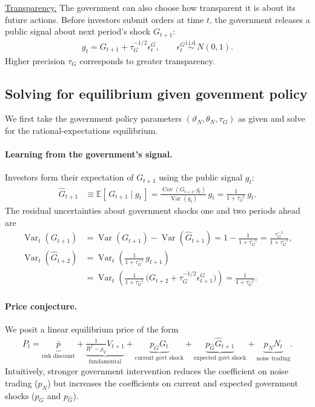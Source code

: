 \documentclass[12pt]{article}
\begin{document}
\underline{Transparency.}
The government can also choose how transparent it is about its future actions. Before investors submit orders at time \(t\), the government releases a public signal about next period's shock \(G_{t+1}\):
\begin{align*}
    g_t = G_{t+1} + \tau_G^{-1/2} \epsilon_t^G, \qquad \epsilon_t^G \stackrel{\text{i.i.d.}}{\sim} N(0,1).
\end{align*}
Higher precision \(\tau_G\) corresponds to greater transparency. 

\subsection{Solving for equilibrium given govenment policy}

We first take the government policy parameters \((\vartheta_N, \theta_N, \tau_G)\) as given and solve for the rational‑expectations equilibrium.

\paragraph{Learning from the government's signal.}
Investors form their expectation of \(G_{t+1}\) using the public signal \(g_t\):
\begin{align*}
    \hat{G}_{t+1} &\equiv \mathbb{E}[\,G_{t+1} \mid g_t\,] 
                  = \frac{\operatorname{Cov}(G_{t+1}, g_t)}{\operatorname{Var}(g_t)} \, g_t 
                  = \frac{1}{1 + \tau_G^{-1}} \, g_t .
\end{align*}
The residual uncertainties about government shocks one and two periods ahead are
\begin{align*}
    \operatorname{Var}_t(G_{t+1}) 
        &= \operatorname{Var}(G_{t+1}) - \operatorname{Var}(\hat{G}_{t+1}) 
          = 1 - \frac{1}{1+\tau_G^{-1}} 
          = \frac{\tau_G^{-1}}{1+\tau_G^{-1}},\\[4pt]
    \operatorname{Var}_t(\hat{G}_{t+2}) 
        &= \operatorname{Var}_t\!\left(\frac{1}{1+\tau_G^{-1}} \, g_{t+1}\right) \\
        &= \operatorname{Var}_t\!\left(
              \frac{1}{1+\tau_G^{-1}} \,
              \bigl(G_{t+2} + \tau_G^{-1/2} \epsilon_{t+1}^G\bigr)
           \right) 
          = \frac{1}{1+\tau_G^{-1}} .
\end{align*}

\paragraph{Price conjecture.}
We posit a linear equilibrium price of the form
\begin{align}
    P_t = \underbrace{\bar{p}}_{\text{risk discount}} 
          + \underbrace{\frac{1}{R^f - \rho_V} V_{t+1}}_{\text{fundamental}} 
          + \underbrace{p_G G_t}_{\text{current govt shock}} 
          + \underbrace{p_{\hat{G}} \hat{G}_{t+1}}_{\text{expected govt shock}} 
          + \underbrace{p_N N_t}_{\text{noise trading}}. \label{price_conjecture}
\end{align}
Intuitively, stronger government intervention reduces the coefficient on noise trading (\(p_N\)) but increases the coefficients on current and expected government shocks (\(p_G\) and \(p_{\hat{G}}\)). 
\end{document}
